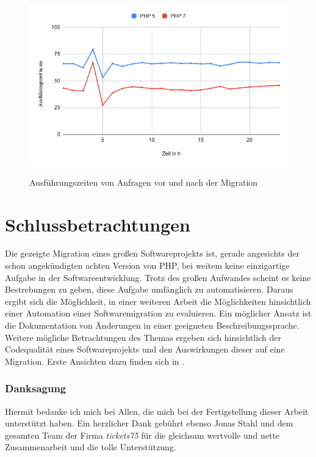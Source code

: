 \begin{figure}[bth]
    \myfloatalign
    {\includegraphics[width=1\linewidth]{gfx/chart}} \quad
    \caption[Ausführungszeiten von Anfragen vor und nach der Migration]{Ausführungszeiten von Anfragen vor und nach der Migration}\label{fig:time}
\end{figure}


\chapter{Schlussbetrachtungen}
Die gezeigte Migration eines großen Softwareprojekts ist, gerade angesichts der schon angekündigten achten Version von \acs{PHP}, 
bei weitem keine einzigartige Aufgabe in der Softwareentwicklung. Trotz des großen Aufwandes scheint es keine Bestrebungen 
zu geben, diese Aufgabe umfänglich zu automatisieren. Daraus ergibt sich die Möglichkeit, in einer weiteren Arbeit die 
Möglichkeiten hinsichtlich einer Automation einer Softwaremigration zu evaluieren. Ein möglicher Ansatz ist die Dokumentation 
von Änderungen in einer geeigneten Beschreibungssprache. Weitere mögliche Betrachtungen des Themas ergeben sich hinsichtlich 
der Codequalität eines Softwareprojekts und den Auswirkungen dieser auf eine Migration. Erste Ansichten dazu finden sich in \cite{martin_clean_2012}.

\subsection{Danksagung}
Hiermit bedanke ich mich bei Allen, die mich bei der Fertigstellung dieser Arbeit unterstützt haben. 
Ein herzlicher Dank gebührt ebenso Jonas Stahl und dem gesamten Team der Firma \textit{tickets75} für die gleichsam wertvolle 
und nette Zusammenarbeit und die tolle Unterstützung.
 
